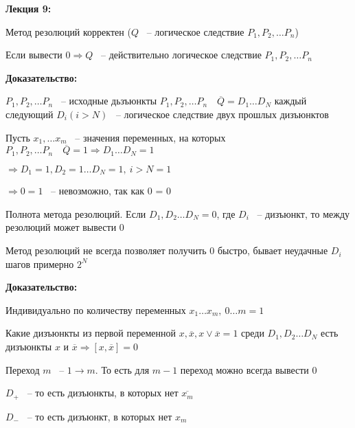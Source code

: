\documentclass[russian]{lecture-notes}
\begin{document}
	\textbf{Лекция 9:}
	
\begin{proposition}
	 Метод резолюций корректен ($Q$ ~-- логическое следствие $P_1, P_2, \dots P_n$)
	 
	 Если вывести $0 \Rightarrow Q$ ~-- действительно логическое следствие $P_1, P_2, \dots P_n$
\end{proposition}

	\textbf{Доказательство:}
	
	$P_1, P_2, \dots P_n$ ~-- исходные дьзъюнкты $P_1, P_2, \dots P_n \quad \overline{Q} = D_1 \dots D_N$ каждый следующий $D_i(i > N)$ ~-- логическое следствие двух прошлых дизъюнктов
	
	Пусть $x_1, \dots x_m$ ~-- значения переменных, на которых $P_1, P_2, \dots P_n \quad \overline{Q} = 1 \Rightarrow D_1 \dots D_N = 1$
	
	$\Rightarrow D_1 = 1, D_2 = 1 \dots D_N = 1, \: i > N = 1$
	
	$\Rightarrow 0 = 1$ ~-- невозможно, так как 0 = 0  

\begin{proposition}
	 Полнота метода резолюций. Если $D_1, D_2 \dots D_N = 0$, где $D_i$ ~-- дизъюнкт, то между резолюций может вывести 0
\end{proposition}

\begin{remark}
	Метод резолюций не всегда позволяет получить 0 быстро, бывает неудачные $D_i$ шагов примерно $2^N$
\end{remark}

	\textbf{Доказательство:}

	Индивидуально по количеству переменных $x_1 \dots x_m, \: 0 \dots m = 1$
	
	Какие дизъюнкты из первой переменной $x, \overline{x}, x \lor \overline{x} = 1$ среди $D_1, D_2 \dots D_N$ есть дизъюнкты $x$ и $\overline{x} \Rightarrow [x, \overline{x}] = 0$
	
	Переход $m$ ~-- $1 \rightarrow m.$  То есть для $m - 1$ переход можно всегда вывести 0
	
	$D_+$ ~-- то есть дизъюнкты, в которых нет $\overline{x_m}$
	
	$D_-$ ~-- то есть дизъюнкт, в которых нет $x_m$
	
\end{document}
